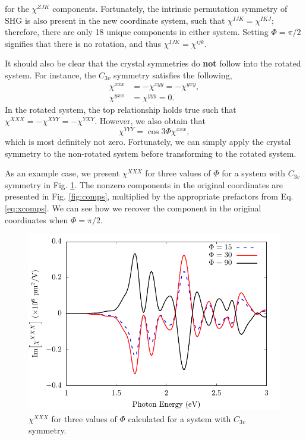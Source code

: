 \documentclass[aps,prb,10pt,letterpaper,notitlepage]{revtex4-1}
\begin{document}
for the $\chi^{ZJK}$ components. Fortunately, the intrinsic permutation symmetry
of SHG is also present in the new coordinate system, such that $\chi^{IJK} =
\chi^{IKJ}$; therefore, there are only 18 unique components in either system.
Setting $\Phi = \pi/2$ signifies that there is no rotation, and thus $\chi^{IJK}
= \chi^{ijk}$.

It should also be clear that the crystal symmetries do \textbf{not} follow into
the rotated system. For instance, the $C_{3v}$ symmetry satisfies the following,
\begin{equation*}
\begin{split}
\chi^{xxx} &= -\chi^{xyy} = - \chi^{yxy},\\
\chi^{yxx} &= \chi^{yyy} = 0.
\end{split}
\end{equation*}
In the rotated system, the top relationship holds true such that $\chi^{XXX} =
-\chi^{XYY} = - \chi^{YXY}$. However, we also obtain that
\begin{equation*}
\chi^{YYY} = \cos3\Phi \chi^{xxx},
\end{equation*}
which is most definitely not zero. Fortunately, we can simply apply the crystal
symmetry to the non-rotated system before transforming to the rotated system.

As an example case, we present $\chi^{XXX}$ for three values of $\Phi$ for a
system with $C_{3v}$ symmetry in Fig. \ref{fig:rotxxx}. The nonzero components
in the original coordinates are presented in Fig. \ref{fig:comps}, multiplied by
the appropriate prefactors from Eq. \eqref{eq:xcomps}. We can see how we recover
the component in the original coordinates when $\Phi = \pi/2$.

\begin{figure}[b]
\centering
\includegraphics[width=0.6\linewidth]{rot/rotxxx.pdf}
\caption{$\chi^{XXX}$ for three values of $\Phi$ calculated for a system with
$C_{3v}$ symmetry.}
\label{fig:rotxxx}
\end{figure}
\end{document}
